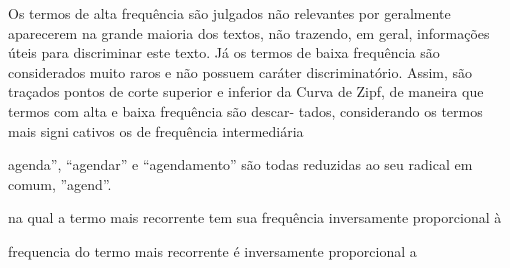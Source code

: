 Os termos de alta frequência são julgados não relevantes por
geralmente aparecerem na grande maioria dos textos, não trazendo, em geral, informações
úteis para discriminar este texto. Já os termos de baixa frequência são considerados muito
raros e não possuem caráter discriminatório. Assim, são traçados pontos de corte superior
e inferior da Curva de Zipf, de maneira que termos com alta e baixa frequência são descar-
tados, considerando os termos mais signicativos os de frequência intermediária
























agenda”, “agendar” e “agendamento” 
são todas reduzidas ao seu radical em comum, ”agend”.  






na qual a termo mais recorrente tem sua frequência inversamente proporcional à



frequencia do termo mais recorrente é inversamente proporcional a






